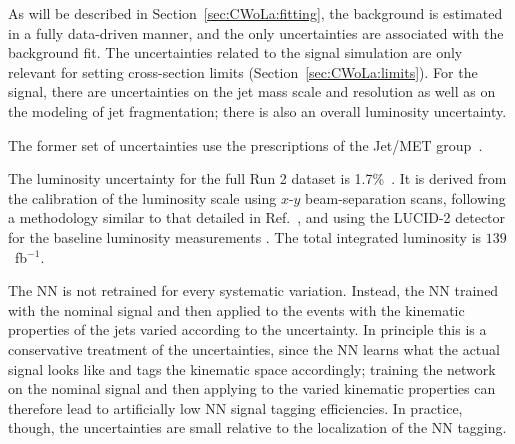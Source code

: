 As will be described in Section~\ref{sec:CWoLa:fitting}, the background is estimated in a fully data-driven manner, and the only uncertainties are associated with the background fit.
The uncertainties related to the signal simulation are only relevant for setting cross-section limits (Section~\ref{sec:CWoLa:limits}).
For the signal, there are uncertainties on the jet mass scale and resolution as well as on the modeling of jet fragmentation; there is also an overall luminosity uncertainty.

The former set of uncertainties use the prescriptions of the Jet/MET group~\cite{TWiki_JetUncertainties_2019}.

The luminosity uncertainty for the full Run 2 dataset is 1.7\%~\cite{TWiki_LuminosityUncertainty}.
It is derived from the calibration of the luminosity scale using $x$-$y$ beam-separation scans, following a methodology similar to that detailed in Ref.~\cite{Aaboud:2016hhf}, and using the LUCID-2 detector for the baseline luminosity measurements \cite{LUCID2}.
The total integrated luminosity is $139$~fb$^{-1}$.


The NN is not retrained for every systematic variation.
Instead, the NN trained with the nominal signal and then applied to the events with the kinematic properties of the jets varied according to the uncertainty.
In principle this is a conservative treatment of the uncertainties, since the NN learns what the actual signal looks like and tags the kinematic space accordingly;
training the network on the nominal signal and then applying to the varied kinematic properties can therefore lead to artificially low NN signal tagging efficiencies.
In practice, though, the uncertainties are small relative to the localization of the NN tagging.


